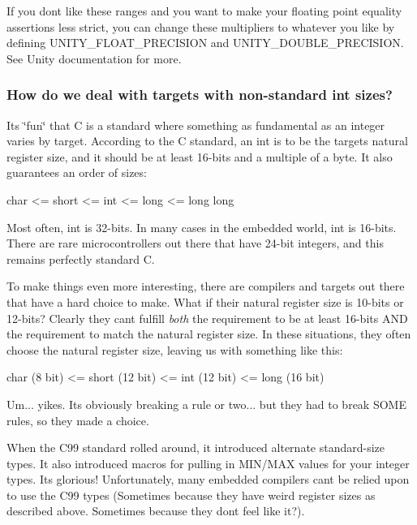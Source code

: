 If you don\textquotesingle{}t like these ranges and you want to make your floating point equality assertions less strict, you can change these multipliers to whatever you like by defining U\+N\+I\+T\+Y\+\_\+\+F\+L\+O\+A\+T\+\_\+\+P\+R\+E\+C\+I\+S\+I\+ON and U\+N\+I\+T\+Y\+\_\+\+D\+O\+U\+B\+L\+E\+\_\+\+P\+R\+E\+C\+I\+S\+I\+ON. See Unity documentation for more.

\subsubsection*{How do we deal with targets with non-\/standard int sizes?}

It\textquotesingle{}s \char`\"{}fun\char`\"{} that C is a standard where something as fundamental as an integer varies by target. According to the C standard, an {\ttfamily int} is to be the target\textquotesingle{}s natural register size, and it should be at least 16-\/bits and a multiple of a byte. It also guarantees an order of sizes\+:


\begin{DoxyCode}
\textcolor{keywordtype}{char} <= \textcolor{keywordtype}{short} <= \textcolor{keywordtype}{int} <= \textcolor{keywordtype}{long} <= \textcolor{keywordtype}{long} \textcolor{keywordtype}{long}
\end{DoxyCode}


Most often, {\ttfamily int} is 32-\/bits. In many cases in the embedded world, {\ttfamily int} is 16-\/bits. There are rare microcontrollers out there that have 24-\/bit integers, and this remains perfectly standard C.

To make things even more interesting, there are compilers and targets out there that have a hard choice to make. What if their natural register size is 10-\/bits or 12-\/bits? Clearly they can\textquotesingle{}t fulfill {\itshape both} the requirement to be at least 16-\/bits A\+ND the requirement to match the natural register size. In these situations, they often choose the natural register size, leaving us with something like this\+:


\begin{DoxyCode}
char (8 bit) <= short (12 bit) <= int (12 bit) <= long (16 bit)
\end{DoxyCode}


Um... yikes. It\textquotesingle{}s obviously breaking a rule or two... but they had to break S\+O\+ME rules, so they made a choice.

When the C99 standard rolled around, it introduced alternate standard-\/size types. It also introduced macros for pulling in M\+I\+N/\+M\+AX values for your integer types. It\textquotesingle{}s glorious! Unfortunately, many embedded compilers can\textquotesingle{}t be relied upon to use the C99 types (Sometimes because they have weird register sizes as described above. Sometimes because they don\textquotesingle{}t feel like it?).

